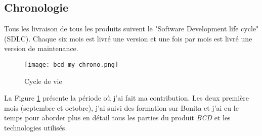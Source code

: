 \subsection{Chronologie}
Tous les livraison de tous les produits suivent le "Software Development life cycle" (SDLC). Chaque six mois est livré une version et une fois par mois est livré une version de maintenance.

\begin{figure}[!ht]
\centering
\texttt{[image: bcd\_my\_chrono.png]}
\caption{Cycle de vie}
\label{bcd_my_chrono}
\end{figure}

La Figure \ref{bcd_my_chrono} présente la période où j'ai fait ma contribution. Les deux première mois (septembre et octobre), j'ai suivi des formation sur Bonita et j'ai eu le temps pour aborder plus en détail tous les parties du produit \emph{BCD} et les technologies utilisés.
